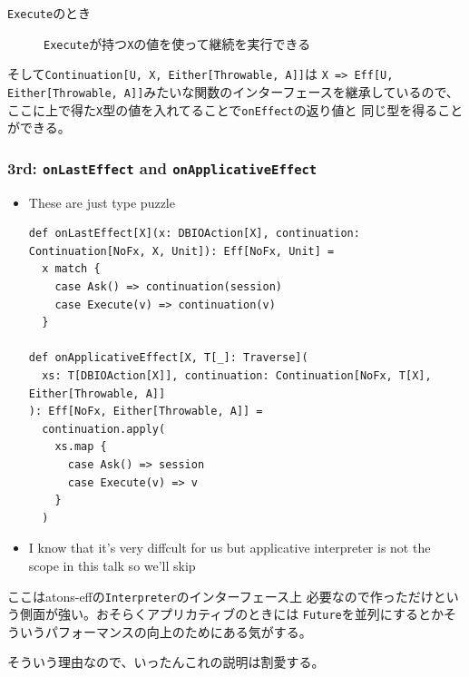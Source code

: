 \begin{frame}[fragile]
\begin{notes}
\begin{description}
      \item[\texttt{Execute}のとき]
      \lstinline|Execute|が持つ\lstinline|X|の値を使って継続を実行できる
    \end{description}    

    \item そして\lstinline|Continuation[U, X, Either[Throwable, A]]|は
    \lstinline|X => Eff[U, Either[Throwable, A]]|みたいな関数のインターフェースを継承しているので、
    ここに上で得た\lstinline|X|型の値を入れてることで\lstinline|onEffect|の返り値と
    同じ型を得ることができる。
  \end{notes}
\end{frame}

\begin{frame}[fragile]
  \frametitle{3rd: \lstinline|onLastEffect| and \lstinline|onApplicativeEffect|}

  \begin{itemize}
    \item<+-> These are just type puzzle
\begin{lstlisting}[style=scala]
def onLastEffect[X](x: DBIOAction[X], continuation: Continuation[NoFx, X, Unit]): Eff[NoFx, Unit] =
  x match {
    case Ask() => continuation(session)
    case Execute(v) => continuation(v)
  }
  
def onApplicativeEffect[X, T[_]: Traverse](
  xs: T[DBIOAction[X]], continuation: Continuation[NoFx, T[X], Either[Throwable, A]]
): Eff[NoFx, Either[Throwable, A]] =
  continuation.apply(
    xs.map {
      case Ask() => session
      case Execute(v) => v
    }
  )
\end{lstlisting}

    \item<+-> I know that it's very diffcult for us
    but applicative interpreter is not the scope in this talk
    so we'll skip
  \end{itemize}

  \begin{notes}
    \item ここはatons-effの\lstinline|Interpreter|のインターフェース上
    必要なので作っただけという側面が強い。おそらくアプリカティブのときには
    \lstinline|Future|を並列にするとかそういうパフォーマンスの向上のためにある気がする。

    \item そういう理由なので、いったんこれの説明は割愛する。
  \end{notes}
\end{frame}

